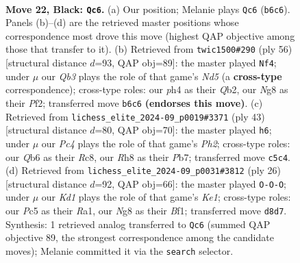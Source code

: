 \documentclass[11pt]{article}
\begin{document}
\clearpage

\begin{figure}[p]\centering
\begin{subfigure}{0.46\textwidth}\centering
\resizebox{\linewidth}{!}{%
\newchessgame
\chessboard[
  setfen={3k2nr/2r3p1/pq1b2Q1/2p3Pp/5P1P/2P5/PP6/RNB1K2R b Q - 0 22},
  showmover=false,
  pgfstyle=straightmove, color=movearrow, markmove={b6-c6}
]}
\caption{}
\end{subfigure}\hfill
\begin{subfigure}{0.46\textwidth}\centering
\resizebox{\linewidth}{!}{%
\newchessgame
\chessboard[
  setfen={5r1k/1p1b2p1/1pn4p/3N1pqP/8/PP2P3/1Q3PB1/3R2K1 w - - 2 29},
  showmover=false,
  pgfstyle=straightmove, color=movearrow, markmove={d5-f4}
]}
\caption{}
\end{subfigure}
\\[4pt]
\begin{subfigure}{0.46\textwidth}\centering
\resizebox{\linewidth}{!}{%
\newchessgame
\chessboard[
  setfen={2rr2k1/1pb1qppp/p7/3pP3/3B3P/1P3QP1/P4P2/2R1R1K1 b - - 0 22},
  showmover=false,
  pgfstyle=straightmove, color=movearrow, markmove={h7-h6}
]}
\caption{}
\end{subfigure}\hfill
\begin{subfigure}{0.46\textwidth}\centering
\resizebox{\linewidth}{!}{%
\newchessgame
\chessboard[
  setfen={r1b1k2r/1p3ppp/p3pn2/4q3/8/Q3B3/PP3PPP/R3KB1R w KQkq - 2 14},
  showmover=false,
  pgfstyle=straightmove, color=movearrow, markmove={e1-c1}
]}
\caption{}
\end{subfigure}
\caption{\textbf{Move 22, Black: \texttt{Qc6}.} (a) Our position; Melanie plays \texttt{Qc6} (\texttt{b6c6}). Panels (b)--(d) are the retrieved master positions whose correspondence most drove this move (highest QAP objective among those that transfer to it). (b) Retrieved from \texttt{twic1500\#290} (ply 56) [structural distance $d$=93, QAP obj=89]: the master played \texttt{Nf4}; under $\mu$ our \emph{Qb3} plays the role of that game's \emph{Nd5} (a \textbf{cross-type} correspondence); cross-type roles: our \emph{p}h4 as their \emph{Q}b2, our \emph{N}g8 as their \emph{P}f2; transferred move \texttt{b6c6} \textbf{(endorses this move)}. (c) Retrieved from \texttt{lichess\_elite\_2024-09\_p0019\#3371} (ply 43) [structural distance $d$=80, QAP obj=70]: the master played \texttt{h6}; under $\mu$ our \emph{Pc4} plays the role of that game's \emph{Ph2}; cross-type roles: our \emph{Q}b6 as their \emph{R}c8, our \emph{R}h8 as their \emph{P}b7; transferred move \texttt{c5c4}. (d) Retrieved from \texttt{lichess\_elite\_2024-09\_p0031\#3812} (ply 26) [structural distance $d$=92, QAP obj=66]: the master played \texttt{O-O-O}; under $\mu$ our \emph{Kd1} plays the role of that game's \emph{Ke1}; cross-type roles: our \emph{P}c5 as their \emph{R}a1, our \emph{N}g8 as their \emph{B}f1; transferred move \texttt{d8d7}. Synthesis: 1 retrieved analog transferred to \texttt{Qc6} (summed QAP objective 89, the strongest correspondence among the candidate moves); Melanie committed it via the \texttt{search} selector.}
\label{fig:thought-m43}
\end{figure}
\end{document}
